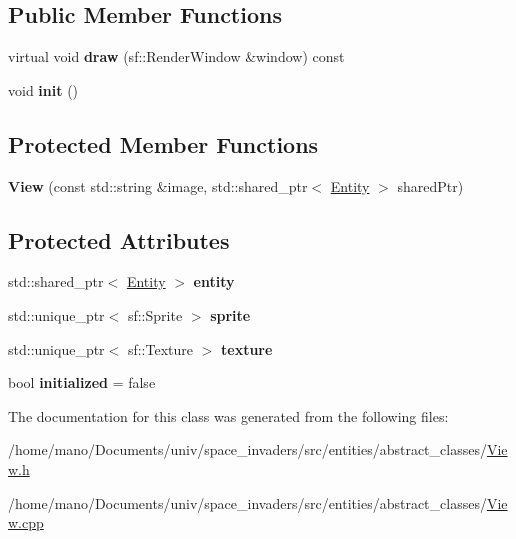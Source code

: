 \subsection*{Public Member Functions}
\begin{DoxyCompactItemize}
\item 
\mbox{\label{classentities_1_1View_ad552142da711120077dd6bb27c8f7b5f}} 
virtual void {\bfseries draw} (sf\+::\+Render\+Window \&window) const
\item 
\mbox{\label{classentities_1_1View_a3aff15a86a88ee075251cd69d6d23926}} 
void {\bfseries init} ()
\end{DoxyCompactItemize}
\subsection*{Protected Member Functions}
\begin{DoxyCompactItemize}
\item 
\mbox{\label{classentities_1_1View_adc22291b6660cef23f325773b21cc476}} 
{\bfseries View} (const std\+::string \&image, std\+::shared\+\_\+ptr$<$ \hyperlink{classentities_1_1Entity}{Entity} $>$ shared\+Ptr)
\end{DoxyCompactItemize}
\subsection*{Protected Attributes}
\begin{DoxyCompactItemize}
\item 
\mbox{\label{classentities_1_1View_aacd0b5eb20efc07425ba1fdde39aaebe}} 
std\+::shared\+\_\+ptr$<$ \hyperlink{classentities_1_1Entity}{Entity} $>$ {\bfseries entity}
\item 
\mbox{\label{classentities_1_1View_a8d21dfa5a6479b509e0c7806d2637d2a}} 
std\+::unique\+\_\+ptr$<$ sf\+::\+Sprite $>$ {\bfseries sprite}
\item 
\mbox{\label{classentities_1_1View_a9858db6cad1df3649e96a3aaa9edea7e}} 
std\+::unique\+\_\+ptr$<$ sf\+::\+Texture $>$ {\bfseries texture}
\item 
\mbox{\label{classentities_1_1View_ae2ebde4944e5808450d560508bf722a6}} 
bool {\bfseries initialized} = false
\end{DoxyCompactItemize}


The documentation for this class was generated from the following files\+:\begin{DoxyCompactItemize}
\item 
/home/mano/\+Documents/univ/space\+\_\+invaders/src/entities/abstract\+\_\+classes/\hyperlink{View_8h}{View.\+h}\item 
/home/mano/\+Documents/univ/space\+\_\+invaders/src/entities/abstract\+\_\+classes/\hyperlink{View_8cpp}{View.\+cpp}\end{DoxyCompactItemize}
